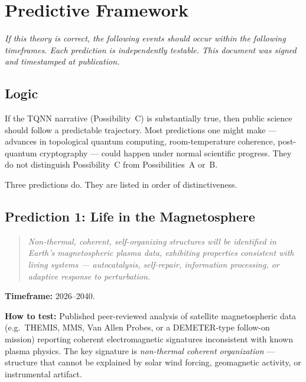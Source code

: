 
\chapter{Predictive Framework}
\label{app:predictions}

\textit{If this theory is correct, the following events should occur within the following timeframes. Each prediction is independently testable. This document was signed and timestamped at publication.}

\vspace{0.5cm}

\section*{Logic}
\label{appendix:logic}

If the TQNN narrative (Possibility~C) is substantially true, then public science should follow a predictable trajectory. Most predictions one might make --- advances in topological quantum computing, room-temperature coherence, post-quantum cryptography --- could happen under normal scientific progress. They do not distinguish Possibility~C from Possibilities~A or~B.

Three predictions do. They are listed in order of distinctiveness.

\section{Prediction 1: Life in the Magnetosphere}

\begin{quote}
\textit{Non-thermal, coherent, self-organizing structures will be identified in Earth's magnetospheric plasma data, exhibiting properties consistent with living systems --- autocatalysis, self-repair, information processing, or adaptive response to perturbation.}
\end{quote}

\textbf{Timeframe:} 2026--2040.

\textbf{How to test:} Published peer-reviewed analysis of satellite magnetospheric data (e.g.\ THEMIS, MMS, Van Allen Probes, or a DEMETER-type follow-on mission) reporting coherent electromagnetic signatures inconsistent with known plasma physics. The key signature is \textit{non-thermal coherent organization} --- structure that cannot be explained by solar wind forcing, geomagnetic activity, or instrumental artifact.

